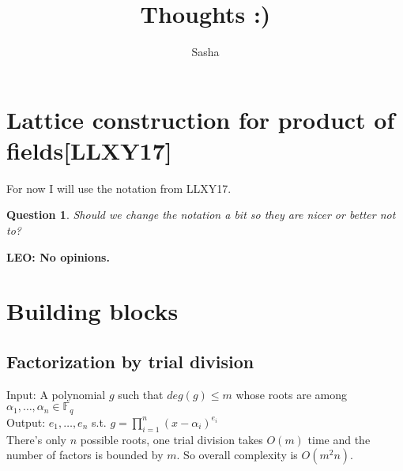 \documentclass[12pt]{article}
\title{Thoughts :)}
\author{ Sasha }
\newtheorem{question}{Question}
\begin{document}
\maketitle

\section{Lattice construction for product of fields[LLXY17]}
For now I will use the notation from LLXY17. 
\begin{question}
Should we change the notation a bit so they are nicer or better not to?
\end{question}
{\bf LEO: No opinions.}

\section{Building blocks}
\subsection{Factorization by trial division}
Input: A polynomial $g$ such that $deg(g) \leq m$ whose roots are among $\alpha_1, \dots , \alpha_n \in \mathbb{F}_q$\\
Output: $e_1, \dots , e_n$ s.t. $g = \prod_{i = 1}^{n}(x - \alpha_i)^{e_i}$\\
There's only $n$ possible roots, one trial division takes $O(m)$ time and the number of factors is bounded by $m$. So overall complexity is $O(m^2n)$.
\end{document}
